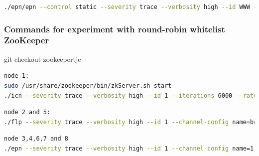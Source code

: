 \documentclass[]{article}
\begin{document}
\begin{lstlisting}[language=bash]
./epn/epn --control static --severity trace --verbosity high --id WWW --primary-interface eth0 --num-flp 2 --channel-config name=WWW,type=pull,method=bind,address=tcp://*:5555,rateLogging=1 name=feedback,type=push,method=connect,address=tcp://10.42.0.1:5000
\end{lstlisting}

\subsubsection{Commands for experiment with round-robin whitelist ZooKeeper }
git checkout zookeepertje
\begin{lstlisting}[language=bash]
node 1:
sudo /usr/share/zookeeper/bin/zkServer.sh start
./icn --severity trace --verbosity high --id 1 --iterations 6000 --rate 200 --channel-config name=broadcast,type=pub,method=bind,rateLogging=0,address=tcp://*:5005
\end{lstlisting}

\begin{lstlisting}[language=bash]
node 2 and 5:
./flp --severity trace --verbosity high --id 1 --channel-config name=broadcast,type=sub,method=connect,rateLogging=1,address=tcp://<ip address of icn>:5005
\end{lstlisting}

\begin{lstlisting}[language=bash]
node 3,4,6,7 and 8
./epn --severity trace --verbosity high --id 1 --channel-config name=1,type=pull,method=bind,address=tcp://<own ip address>:5555,rateLogging=1
\end{lstlisting}
\end{document}
